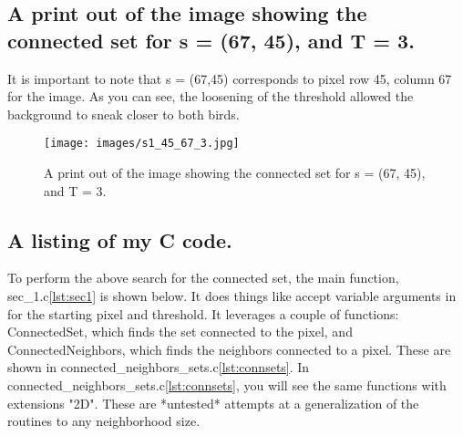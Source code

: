 \documentclass{article}
\begin{document}
\subsection{A print out of the image showing the connected set for s = (67, 45), and T = 3.}
It is important to note that s = (67,45) corresponds to pixel row 45, column 67 for the image. As you can see, the loosening of the threshold allowed the background to sneak closer to both birds.
\begin{figure}[h]
    \centering
    \texttt{[image: images/s1\_45\_67\_3.jpg]}
    \caption{A print out of the image showing the connected set for s = (67, 45), and T = 3.}
    \label{fig:4}
\end{figure}
\newpage
\subsection{A listing of my C code.}
To perform the above search for the connected set, the main function, sec\_1.c\ref{lst:sec1} is shown below. It does things like accept variable arguments in for the starting pixel and threshold. It leverages a couple of functions: ConnectedSet, which finds the set connected to the pixel, and ConnectedNeighbors, which finds the neighbors connected to a pixel. These are shown in connected\_neighbors\_sets.c\ref{lst:connsets}.
In connected\_neighbors\_sets.c\ref{lst:connsets}, you will see the same functions with extensions "2D". These are *untested* attempts at a generalization of the routines to any neighborhood size.
\end{document}
